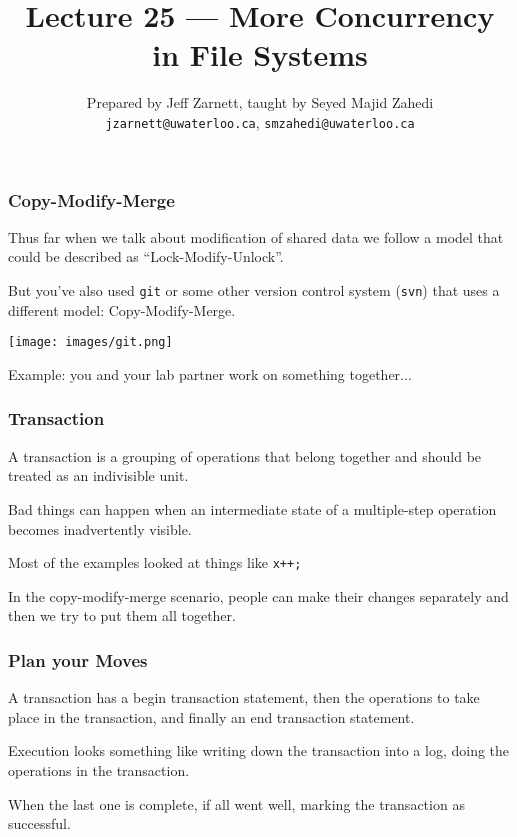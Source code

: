 

\title{Lecture 25 --- More Concurrency in File Systems }

\author{Prepared by Jeff Zarnett, taught by Seyed Majid Zahedi \\ \small \texttt{jzarnett@uwaterloo.ca}, \texttt{smzahedi@uwaterloo.ca}}

\date{}




\begin{frame}
	\titlepage

\end{frame}


\begin{frame}
	\frametitle{Copy-Modify-Merge}

	Thus far when we talk about modification of shared data we follow a model that could be described as ``Lock-Modify-Unlock''.

	But you've also used \texttt{git} or some other version control system (\texttt{svn}) that uses a different model: Copy-Modify-Merge.

	\begin{center}
		\texttt{[image: images/git.png]}
	\end{center}

	Example: you and your lab partner work on something together...

\end{frame}


\begin{frame}
	\frametitle{Transaction}

	A \alert{transaction} is a grouping of operations that belong together and should be treated as an indivisible unit.

	Bad things can happen when an intermediate state of a multiple-step operation becomes inadvertently visible.

	Most of the examples looked at things like \texttt{x++;}

	In the copy-modify-merge scenario, people can make their changes separately and then we try to put them all together.

\end{frame}

\begin{frame}
	\frametitle{Plan your Moves}

	A transaction has a begin transaction statement, then the operations to take place in the transaction, and finally an end transaction statement.

	Execution looks something like writing down the transaction into a log, doing the operations in the transaction.

	When the last one is complete, if all went well, marking the transaction as successful.

\end{frame}


